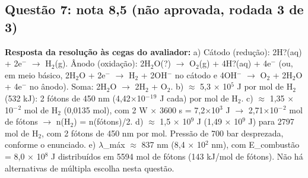 \documentclass{article}%
\begin{document}
\subsection*{Questão 7: nota 8,5 (não aprovada, rodada 3 de 3)}%
\textbf{Resposta da resolução às cegas do avaliador:} a) Cátodo (redução): 2H?(aq) + 2e$^{-}$ $\to$ H$_{2}$(g). Ânodo (oxidação): 2H$_{2}$O(?) $\to$ O$_{2}$(g) + 4H?(aq) + 4e$^{-}$ (ou, em meio básico, 2H$_{2}$O + 2e$^{-}$ $\to$ H$_{2}$ + 2OH$^{-}$ no cátodo e 4OH$^{-}$ $\to$ O$_{2}$ + 2H$_{2}$O + 4e$^{-}$ no ânodo). Soma: 2H$_{2}$O $\to$ 2H$_{2}$ + O$_{2}$.\newline%
\newline%
b) $\approx$ 5,3 $\times$ 10$^{5}$ J por mol de H$_{2}$ (532 kJ): 2 fótons de 450 nm (4,42$\times$10$^{-}$$^{1}$$^{9}$ J cada) por mol de H$_{2}$.\newline%
\newline%
c) $\approx$ 1,35 $\times$ 10$^{-}$$^2$ mol de H$_{2}$ (0,0135 mol), com 2 W $\times$ 3600 s = 7,2$\times$10$^3$ J $\to$ 2,71$\times$10$^{-}$$^2$ mol de fótons $\to$ n(H$_{2}$) = n(fótons)/2.\newline%
\newline%
d) $\approx$ 1,5 $\times$ 10$^{9}$ J (1,49 $\times$ 10$^{9}$ J) para 2797 mol de H$_{2}$, com 2 fótons de 450 nm por mol. Pressão de 700 bar desprezada, conforme o enunciado.\newline%
\newline%
e) $\lambda$\_máx $\approx$ 837 nm (8,4 $\times$ 10$^2$ nm), com E\_combustão = 8,0 $\times$ 10$^{8}$ J distribuídos em 5594 mol de fótons (143 kJ/mol de fótons).\newline%
\newline%
Não há alternativas de múltipla escolha nesta questão.\par %
\end{document}
